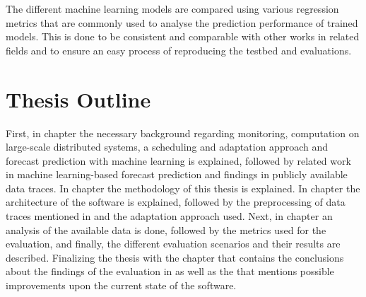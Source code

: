             The different machine learning models are compared using various regression metrics that are commonly used to analyse the prediction performance of trained models. This is done to be consistent and comparable with other works in related fields and to ensure an easy process of reproducing the testbed and evaluations.

            




        

        
        \section{Thesis Outline}
        \label{sec:thesis-outline-introduction}

            First, in chapter  the necessary background regarding monitoring, computation on large-scale distributed systems, a scheduling and adaptation approach and forecast prediction with machine learning is explained, followed by related work in machine learning-based forecast prediction and findings in publicly available data traces.
            In chapter  the methodology of this thesis is explained. 
            In chapter  the architecture of the software is explained, followed by the preprocessing of data traces mentioned in  and the adaptation approach used.
            Next, in chapter  an analysis of the available data is done, followed by the metrics used for the evaluation, and finally, the different evaluation scenarios and their results are described.
            Finalizing the thesis with the chapter  that contains the conclusions about the findings of the evaluation in  as well as the  that mentions possible improvements upon the current state of the software.


